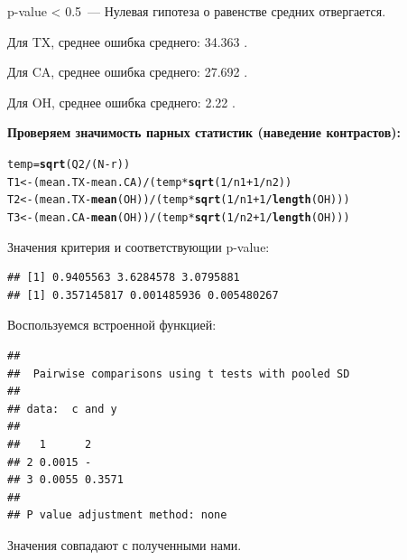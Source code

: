 \documentclass{article}\usepackage[]{graphicx}\usepackage[]{color}
\makeatletter
\newcommand{\hlnum}[1]{\textcolor[rgb]{0.686,0.059,0.569}{#1}}%
\newcommand{\hlopt}[1]{\textcolor[rgb]{0,0,0}{#1}}%
\newcommand{\hlstd}[1]{\textcolor[rgb]{0.345,0.345,0.345}{#1}}%
\newcommand{\hlkwb}[1]{\textcolor[rgb]{0.69,0.353,0.396}{#1}}%
\newcommand{\hlkwd}[1]{\textcolor[rgb]{0.737,0.353,0.396}{\textbf{#1}}}%
\newenvironment{kframe}{%
 \def\at@end@of@kframe{}%
 \ifinner\ifhmode%
  \def\at@end@of@kframe{\end{minipage}}%
  \begin{minipage}{\columnwidth}%
 \fi\fi%
 \def\FrameCommand##1{\hskip\@totalleftmargin \hskip-\fboxsep
 \colorbox{shadecolor}{##1}\hskip-\fboxsep
     \hskip-\linewidth \hskip-\@totalleftmargin \hskip\columnwidth}%
 \MakeFramed {\advance\hsize-\width
   \@totalleftmargin\z@ \linewidth\hsize
   \@setminipage}}%
 {\par\unskip\endMakeFramed%
 \at@end@of@kframe}
\newenvironment{knitrout}{}{} %
\makeatother
\begin{document}
p-value < 0.5~--- Нулевая гипотеза о равенстве средних отвергается.

Для TX, среднее \textpm ошибка среднего: 34.363 .

Для CA, среднее \textpm ошибка среднего: 27.692 .

Для OH, среднее \textpm ошибка среднего: 2.22 .


\textbf{Проверяем значимость парных статистик (наведение контрастов):}
\begin{knitrout}
\color{fgcolor}\begin{kframe}
\begin{alltt}
\hlstd{temp} \hlkwb{=} \hlkwd{sqrt}\hlstd{(Q2} \hlopt{/} \hlstd{(N} \hlopt{-} \hlstd{r))}
\hlstd{T1} \hlkwb{<-} \hlstd{(mean.TX} \hlopt{-} \hlstd{mean.CA)} \hlopt{/} \hlstd{(temp} \hlopt{*} \hlkwd{sqrt}\hlstd{(}\hlnum{1} \hlopt{/} \hlstd{n1} \hlopt{+} \hlnum{1} \hlopt{/} \hlstd{n2))}
\hlstd{T2} \hlkwb{<-} \hlstd{(mean.TX} \hlopt{-} \hlkwd{mean}\hlstd{(OH))} \hlopt{/} \hlstd{(temp} \hlopt{*} \hlkwd{sqrt}\hlstd{(}\hlnum{1} \hlopt{/} \hlstd{n1} \hlopt{+} \hlnum{1} \hlopt{/} \hlkwd{length}\hlstd{(OH)))}
\hlstd{T3} \hlkwb{<-} \hlstd{(mean.CA} \hlopt{-} \hlkwd{mean}\hlstd{(OH))} \hlopt{/} \hlstd{(temp} \hlopt{*} \hlkwd{sqrt}\hlstd{(}\hlnum{1} \hlopt{/} \hlstd{n2} \hlopt{+} \hlnum{1} \hlopt{/} \hlkwd{length}\hlstd{(OH)))}
\end{alltt}
\end{kframe}
\end{knitrout}
Значения критерия и соответствующии p-value:
\begin{knitrout}
\color{fgcolor}\begin{kframe}
\begin{verbatim}
## [1] 0.9405563 3.6284578 3.0795881
## [1] 0.357145817 0.001485936 0.005480267
\end{verbatim}
\end{kframe}
\end{knitrout}
Воспользуемся встроенной функцией:
\begin{knitrout}
\color{fgcolor}\begin{kframe}
\begin{verbatim}
## 
## 	Pairwise comparisons using t tests with pooled SD 
## 
## data:  c and y 
## 
##   1      2     
## 2 0.0015 -     
## 3 0.0055 0.3571
## 
## P value adjustment method: none
\end{verbatim}
\end{kframe}
\end{knitrout}
Значения совпадают с полученными нами.
\end{document}
